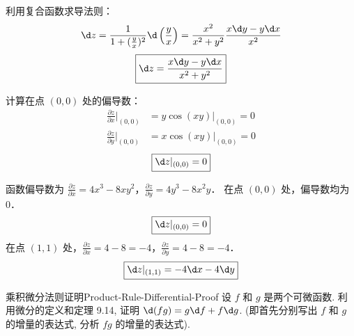 \begin{solution}
    利用复合函数求导法则：
    \begin{equation}
        \d z = \frac{1}{1 + (\frac{y}{x})^2} \d \left( \frac{y}{x} \right) = \frac{x^2}{x^2 + y^2} \frac{x \d y - y \d x}{x^2}
    \end{equation}
    \begin{equation}
        \boxed{\d z = \frac{x \d y - y \d x}{x^2 + y^2}}
    \end{equation}

    计算在点 $(0,0)$ 处的偏导数：
    \begin{equation}
        \begin{aligned}
            \frac{\partial z}{\partial x}\bigg|_{(0,0)} & = y \cos(xy) \bigg|_{(0,0)} = 0 \\
            \frac{\partial z}{\partial y}\bigg|_{(0,0)} & = x \cos(xy) \bigg|_{(0,0)} = 0
        \end{aligned}
    \end{equation}
    \begin{equation}
        \boxed{\d z|_{(0,0)} = 0}
    \end{equation}

    函数偏导数为 $\frac{\partial z}{\partial x} = 4x^3 - 8xy^2$，$\frac{\partial z}{\partial y} = 4y^3 - 8x^2y$．
    在点 $(0,0)$ 处，偏导数均为 $0$．
    \begin{equation}
        \boxed{\d z|_{(0,0)} = 0}
    \end{equation}
    在点 $(1,1)$ 处，$\frac{\partial z}{\partial x} = 4 - 8 = -4$，$\frac{\partial z}{\partial y} = 4 - 8 = -4$．
    \begin{equation}
        \boxed{\d z|_{(1,1)} = -4 \d x - 4 \d y}
    \end{equation}
\end{solution}

\begin{problem}{乘积微分法则证明}{Product-Rule-Differential-Proof}
    设 $f$ 和 $g$ 是两个可微函数. 利用微分的定义和定理 9.14, 证明 $\d(fg) = g \d f + f \d g$. (即首先分别写出 $f$ 和 $g$ 的增量的表达式, 分析 $fg$ 的增量的表达式).
\end{problem}

